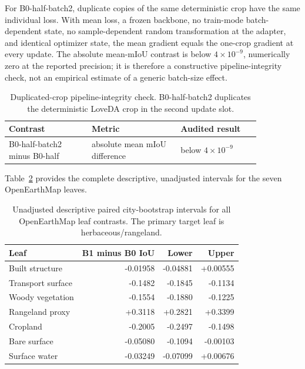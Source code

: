 For B0-half-batch2, duplicate copies of the same deterministic crop have the same individual loss. With mean loss, a frozen backbone, no train-mode batch-dependent state, no sample-dependent random transformation at the adapter, and identical optimizer state, the mean gradient equals the one-crop gradient at every update. The absolute mean-mIoU contrast is below \(4\times10^{-9}\), numerically zero at the reported precision; it is therefore a constructive pipeline-integrity check, not an empirical estimate of a generic batch-size effect.

\begin{table}[h]
\centering
\caption{Duplicated-crop pipeline-integrity check. B0-half-batch2 duplicates the deterministic LoveDA crop in the second update slot.}
\label{tab:batch_integrity}
\begin{tabular}{@{}p{0.28\linewidth}p{0.30\linewidth}p{0.27\linewidth}@{}}
\toprule
Contrast & Metric & Audited result \\
\midrule
B0-half-batch2 minus B0-half & absolute mean mIoU difference & below \(4\times10^{-9}\) \\
\bottomrule
\end{tabular}
\end{table}

Table~\ref{tab:all_leaf_contrasts} provides the complete descriptive, unadjusted intervals for the seven OpenEarthMap leaves.

\begin{table}[h]
\centering
\caption{Unadjusted descriptive paired city-bootstrap intervals for all OpenEarthMap leaf contrasts. The primary target leaf is herbaceous/rangeland.}
\label{tab:all_leaf_contrasts}
\begin{tabular}{lrrr}
\toprule
Leaf & B1 minus B0 IoU & Lower & Upper \\
\midrule
Built structure & -0.01958 & -0.04881 & +0.00555 \\
Transport surface & -0.1482 & -0.1845 & -0.1134 \\
Woody vegetation & -0.1554 & -0.1880 & -0.1225 \\
Rangeland proxy & +0.3118 & +0.2821 & +0.3399 \\
Cropland & -0.2005 & -0.2497 & -0.1498 \\
Bare surface & -0.05080 & -0.1094 & -0.00103 \\
Surface water & -0.03249 & -0.07099 & +0.00676 \\
\bottomrule
\end{tabular}
\end{table}

